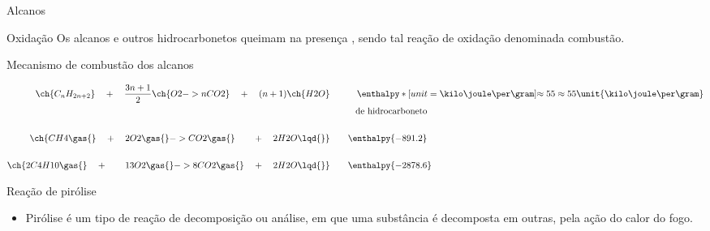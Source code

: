 \documentclass{beamer}
\begin{document}
\begin{frame}[label={sec:org5997c1c}]{Alcanos}
\begin{block}{Oxidação}
Os \alert{alcanos} e outros \alert{hidrocarbonetos} queimam na presença , sendo tal reação de oxidação denominada
\alert{combustão}.


\begin{bclogo}[couleur=blue!30 , arrondi=0.1 , logo=\bcplume , epBarre=3.5]{Mecanismo de combustão dos alcanos}


\begin{align*}
\ch{C_nH_{2n+2}} \quad + \quad  \frac{3n+1}{2}\ch{O2 -> n CO2}\quad +\quad (n+1)\ch{H2O} & \qquad \quad \enthalpy*[unit=\kilo\joule\per\gram]{\approx 55} \approx 55 \unit{\kilo\joule\per\gram}\\ & \hspace{1cm} \mathrm{de~hidrocarboneto} \\ \\
\ch{CH4\gas{} \quad{} + \quad{} 2 O2\gas{} -> CO2\gas{} \qquad{} + \quad{} 2 H2O\lqd{}} & \quad \quad \enthalpy{-891.2}\\ \\
	\ch{2 C4H10\gas{} \quad{} + \qquad{} 13 O2\gas{} -> 8 CO2\gas{} \quad{} + \quad{} 2 H2O\lqd{}} & \quad \quad \enthalpy{-2878.6}    
\end{align*}
\end{bclogo}
\end{block}


\begin{block}{Reação de pirólise}
\begin{itemize}
\item \alert{Pirólise} é um tipo de reação de decomposição ou análise, em que uma substância é decomposta em outras, pela ação do calor do fogo.
\end{itemize}





\end{block}
\end{frame}
\end{document}
